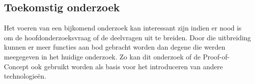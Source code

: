 \documentclass[a0,portrait]{a0poster}
\begin{document}
\begin{multicols}{2}
\color{HoGentAccent1} 
\section*{Toekomstig onderzoek}
\color{black}

Het voeren van een bijkomend onderzoek kan interessant zijn indien er nood is om de hoofdonderzoeksvraag of de deelvragen uit te breiden. Door die uitbreiding kunnen er meer functies aan bod gebracht worden dan degene die werden meegegeven in het huidige onderzoek. Zo kan dit onderzoek of de Proof-of-Concept ook gebruikt worden als basis voor het introduceren van andere technologieën. 



\end{multicols}
\end{document}
